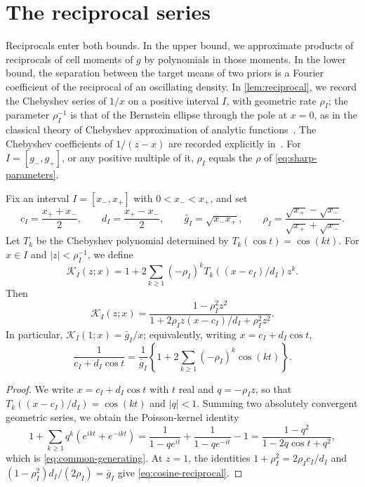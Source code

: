 \section{The reciprocal series}\label{sec:proof-tools}

Reciprocals enter both bounds. In the upper bound, we approximate
products of reciprocals of cell moments of $g$ by polynomials in those
moments. In the lower bound, the separation between the target means of
two priors is a Fourier coefficient of the reciprocal of an oscillating
density. In \cref{lem:reciprocal}, we record the Chebyshev series
of $1/x$ on a positive interval $I$, with geometric rate $\rho_I$; the parameter
$\rho_I^{-1}$ is that of the Bernstein ellipse through the pole at $x=0$,
as in the classical theory of Chebyshev approximation of analytic
functions~\cite[Chapter~8]{trefethen}. The Chebyshev coefficients of
$1/(z-x)$ are recorded explicitly in~\cite[Lemma~1, equation~(10), p.~598]{mathar2006}. For
$I=[g_-,g_+]$, or any positive multiple of it, $\rho_I$ equals the $\rho$
of \eqref{eq:sharp-parameters}.

\begin{lemma}\label{lem:reciprocal}
Fix an interval $I=[x_-,x_+]$ with $0<x_-<x_+$, and set
\[
 c_I=\frac{x_++x_-}{2},\qquad d_I=\frac{x_+-x_-}{2},\qquad
 \bar g_I=\sqrt{x_-x_+},\qquad
 \rho_I=\frac{\sqrt{x_+}-\sqrt{x_-}}{\sqrt{x_+}+\sqrt{x_-}}.
\]
Let $T_k$ be the Chebyshev polynomial determined by
$T_k(\cos t)=\cos(kt)$. For $x\in I$ and $|z|<\rho_I^{-1}$, we define
\[
 \mathcal K_I(z;x)=1+2\sum_{k\ge1}(-\rho_I)^kT_k((x-c_I)/d_I)z^k.
\]
Then
\begin{equation}\label{eq:common-generating}
 \mathcal K_I(z;x)=\frac{1-\rho_I^2z^2}
          {1+2\rho_Iz(x-c_I)/d_I+\rho_I^2z^2}.
\end{equation}
In particular, $\mathcal K_I(1;x)=\bar g_I/x$; equivalently, writing
$x=c_I+d_I\cos t$,
\begin{equation}\label{eq:cosine-reciprocal}
 \frac1{c_I+d_I\cos t}
 =\frac1{\bar g_I}
    \left\{1+2\sum_{k\ge1}(-\rho_I)^k\cos(kt)\right\}.
\end{equation}
\end{lemma}
\begin{proof}
We write $x=c_I+d_I\cos t$ with $t$ real and $q=-\rho_Iz$, so that
$T_k((x-c_I)/d_I)=\cos(kt)$ and $|q|<1$. Summing two absolutely
convergent geometric series, we obtain the Poisson-kernel
identity~\cite[Chapter~2]{steinshakarchi}
\[
 1+\sum_{k\ge1}q^k(e^{ikt}+e^{-ikt})
 =\frac1{1-qe^{it}}+\frac1{1-qe^{-it}}-1
 =\frac{1-q^2}{1-2q\cos t+q^2},
\]
which is \eqref{eq:common-generating}. At $z=1$, the identities
$1+\rho_I^2=2\rho_Ic_I/d_I$ and $(1-\rho_I^2)d_I/(2\rho_I)=\bar g_I$ give
\eqref{eq:cosine-reciprocal}.
\end{proof}

